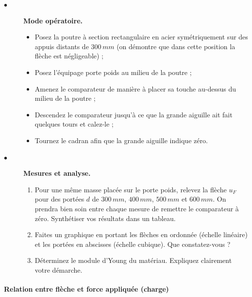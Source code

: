 \documentclass[lecture.tex]{subfiles}
\begin{document}
\begin{description}
  \item[$\bullet$] \textbf{Mode opératoire.}
\begin{itemize}[label =  , font =\tiny]
\item Posez la poutre à section rectangulaire en acier symétriquement sur des appuis distants de $300\, mm$ (on démontre que dans cette position la flèche est négligeable) ;
\item Posez l'équipage porte poids au milieu de la poutre ;
\item Amenez le comparateur de manière à placer sa touche au-dessus du milieu de la poutre ;
\item Descendez le comparateur jusqu'à ce que la grande aiguille ait fait quelques tours et calez-le ;
\item Tournez le cadran afin que la grande aiguille indique zéro.
\end{itemize}

  \item[$\bullet$] \textbf{Mesures et analyse.}
\begin{enumerate}[resume]
\item Pour une même masse placée sur le porte poids, relevez la flèche $u_F$ pour des portées $d$ de $300\, mm$, $400\, mm$, $500\, mm$ et $600\, mm$. On prendra bien soin entre chaque mesure de remettre le comparateur à zéro. Synthétiser vos résultats dans un tableau.
\item Faites un graphique en portant les flèches en ordonnée (échelle linéaire) et les portées en abscisses (échelle cubique). Que constatez-vous ?
\item Déterminez le module d'Young du matériau. Expliquez clairement votre démarche.
\end{enumerate}

\end{description}

\paragraph*{Relation entre flèche et force appliquée (charge)}
\end{document}
